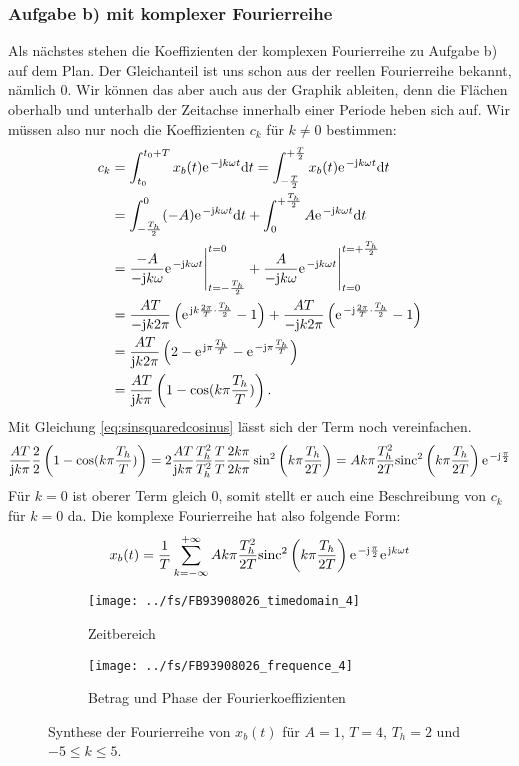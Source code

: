 \documentclass[11pt,a4paper,DIV=12]{scrartcl}
\newcommand{\sinc}{\mathrm{sinc}}
\begin{document}
\subsubsection{Aufgabe b) mit komplexer Fourierreihe}
Als nächstes stehen die Koeffizienten der komplexen Fourierreihe zu Aufgabe b) auf dem Plan.
%
Der Gleichanteil ist uns schon aus der reellen Fourierreihe bekannt, nämlich $0$. %
Wir können das aber auch aus der Graphik ableiten, denn die Flächen oberhalb und
unterhalb der Zeitachse innerhalb einer Periode heben sich auf.
%
Wir müssen also nur noch die Koeffizienten $c_k$ für $k\neq 0$ bestimmen:
%
%
%
\begin{align}
	c_k&=\int_{t_0}^{t_0+T}x_{b}(t)\e^{-\im k \omega t}\diff t
	=\int_{-\frac{T}{2}}^{+\frac{T}{2}}x_{b}(t)\e^{-\im k \omega t}\diff t \nonumber \\
	&= \int_{-\frac{T_h}{2}}^{0}(-A)\e^{-\im k \omega t}\diff t+\int_{0}^{+\frac{T_h}{2}}A\e^{-\im k \omega t}\diff t  \nonumber \\
	&= \frac{-A}{-\im k \omega}\e^{-\im k \omega t}\Bigg |_{t=-\frac{T_h}{2}}^{t=0}+\frac{A}{-\im k \omega}\e^{-\im k \omega t}\Bigg |_{t=0}^{t=+\frac{T_h}{2}} \nonumber \\
	&= \frac{AT}{-\im k 2\pi }\left (\e^{\im k \frac{2\pi}{T}\cdot \frac{T_h}{2}}-1\right )+\frac{AT}{-\im k 2\pi}\left (\e^{-\im\frac{2\pi}{T}\cdot\frac{T_h}{2}}-1\right )\nonumber \\
	&=\frac{AT}{\im k 2 \pi}\left (2 -\e^{\im\pi\frac{T_h}{T}}-\e^{-\im\pi\frac{T_h}{T}} \right )\nonumber \\
	\label{eq:CKTaskBComplex}
	&=\frac{AT}{\im k \pi}\left ( 1-\cos(k\pi\frac{T_h}{T})\right ).
\end{align}
%
%
%
Mit Gleichung \ref{eq:sinsquaredcosinus} lässt sich der Term noch
vereinfachen.
%
\begin{gather}
	\frac{AT}{\im k \pi}\frac{2}{2}\left ( 1-\cos(k\pi\frac{T_h}{T})\right )
	=2\frac{AT}{\im k\pi}\frac{T_h^2}{T_h^2}\frac{T}{T}\frac{2k\pi}{2k\pi}\sin^2\left(k\pi\frac{T_h}{2T}\right)
	= Ak\pi\frac{T_h^2}{2T} \sinc^2\left(k\pi\frac{T_h}{2T}\right)\e^{-\im\frac{\pi}{2}}
\end{gather}
%
Für $k=0$ ist oberer Term gleich $0$, somit stellt er auch eine Beschreibung von
$c_k$ für $k=0$ da.
%
Die komplexe Fourierreihe hat also folgende Form:
\begin{align}
	x_{b}(t)=\frac{1}{T}\sum_{k=-\infty}^{+\infty}Ak\pi\frac{T_h^2}{2T} \sinc^2\left(k\pi\frac{T_h}{2T}\right)\e^{-\im\frac{\pi}{2}}\e^{\im k \omega t}
\end{align}
%
%
\begin{figure}
	\centering
	\begin{subfigure}{\textwidth}
		\texttt{[image: ../fs/FB93908026\_timedomain\_4]}
		\caption{Zeitbereich}
	\end{subfigure}
	\begin{subfigure}{\textwidth}
		\texttt{[image: ../fs/FB93908026\_frequence\_4]}
		\caption{Betrag und Phase der Fourierkoeffizienten}
	\end{subfigure}
	\caption{Synthese der Fourierreihe von $x_b(t)$ für $A=1$, $T=4$, $T_h=2$ und
		$-5\leq k\leq5$.}
\end{figure}
%
%
\newpage
\end{document}
